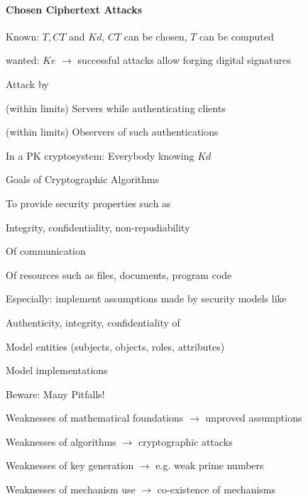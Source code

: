 \documentclass[a4paper]{article}
\begin{document}
\begin{multicols}{3}
    \paragraph{Chosen Ciphertext Attacks}
    \begin{itemize*}
        \item Known: $T,CT$ and $Kd$, $CT$ can be chosen, $T$ can be computed
        \item wanted: $Ke$ $\rightarrow$ successful attacks allow forging digital signatures
        \item Attack by
        \begin{itemize*}
            \item (within limits) Servers while authenticating clients
            \item (within limits) Observers of such authentications
            \item In a PK cryptosystem: Everybody knowing $Kd$
        \end{itemize*}
    \end{itemize*}

    Goals of Cryptographic Algorithms
    \begin{itemize*}
        \item To provide security properties such as
        \begin{itemize*}
            \item Integrity, confidentiality, non-repudiability
            \item Of communication
            \item Of resources such as files, documents, program code
        \end{itemize*}
        \item Especially: implement assumptions made by security models like
        \begin{itemize*}
            \item Authenticity, integrity, confidentiality of
            \item Model entities (subjects, objects, roles, attributes)
            \item Model implementations
        \end{itemize*}
    \end{itemize*}

    Beware: Many Pitfalls!
    \begin{itemize*}
        \item Weaknesses of mathematical foundations $\rightarrow$ unproved assumptions
        \item Weaknesses of algorithms $\rightarrow$ cryptographic attacks
        \item Weaknesses of key generation $\rightarrow$ e.g. weak prime numbers
        \item Weaknesses of mechanism use $\rightarrow$ co-existence of mechanisms
    \end{itemize*}


\end{multicols}
\end{document}
